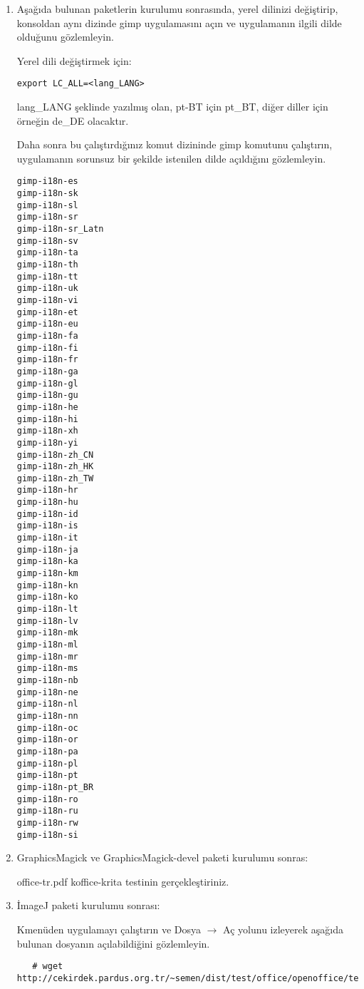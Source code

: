 \documentclass[a4paper,10pt]{article}
\begin{document}
\begin{enumerate}
Aşağıda bulunan komutların sorunsuz olarak çalıştığını gözlemleyin.
\begin{verbatim}
# wget http://cekirdek.pardus.org.tr/~semen/dist/test/multimedia/graphics/test_graphviz.mm
# mm2gv  test_graphviz.mm -o test.gv
# dotty test.gv
# gv2gxl test.gv -o test.gxl
# gxl2dot test.gxl test.dot
# acyclic test.dot test_asyclic.dot
# lneato test.dot
# vimdot test.dot
\end{verbatim}

 \item Aşağıda bulunan paketlerin kurulumu sonrasında, yerel dilinizi değiştirip, konsoldan aynı dizinde gimp uygulamasını açın ve uygulamanın ilgili dilde olduğunu gözlemleyin.

Yerel dili değiştirmek için:
\begin{verbatim}
export LC_ALL=<lang_LANG>
\end{verbatim}

lang\_LANG şeklinde yazılmış olan, pt-BT için pt\_BT, diğer diller için örneğin de\_DE olacaktır.

Daha sonra bu çalıştırdığınız komut dizininde gimp komutunu çalıştırın, uygulamanın sorunsuz bir şekilde istenilen dilde açıldığını gözlemleyin.
\begin{verbatim}
gimp-i18n-es
gimp-i18n-sk
gimp-i18n-sl
gimp-i18n-sr
gimp-i18n-sr_Latn
gimp-i18n-sv
gimp-i18n-ta
gimp-i18n-th
gimp-i18n-tt
gimp-i18n-uk
gimp-i18n-vi
gimp-i18n-et
gimp-i18n-eu
gimp-i18n-fa
gimp-i18n-fi
gimp-i18n-fr
gimp-i18n-ga
gimp-i18n-gl
gimp-i18n-gu
gimp-i18n-he
gimp-i18n-hi
gimp-i18n-xh
gimp-i18n-yi
gimp-i18n-zh_CN
gimp-i18n-zh_HK
gimp-i18n-zh_TW
gimp-i18n-hr
gimp-i18n-hu
gimp-i18n-id
gimp-i18n-is
gimp-i18n-it
gimp-i18n-ja
gimp-i18n-ka
gimp-i18n-km
gimp-i18n-kn
gimp-i18n-ko
gimp-i18n-lt
gimp-i18n-lv
gimp-i18n-mk
gimp-i18n-ml
gimp-i18n-mr
gimp-i18n-ms
gimp-i18n-nb
gimp-i18n-ne
gimp-i18n-nl
gimp-i18n-nn
gimp-i18n-oc
gimp-i18n-or
gimp-i18n-pa
gimp-i18n-pl
gimp-i18n-pt
gimp-i18n-pt_BR
gimp-i18n-ro
gimp-i18n-ru
gimp-i18n-rw
gimp-i18n-si 
\end{verbatim}


 \item GraphicsMagick ve GraphicsMagick-devel paketi kurulumu sonras:

office-tr.pdf koffice-krita testinin gerçekleştiriniz.

 \item İmageJ paketi kurulumu sonrası:

 Kmenüden uygulamayı çalıştırın ve Dosya $\rightarrow$ Aç yolunu izleyerek aşağıda bulunan dosyanın açılabildiğini gözlemleyin.
  \begin{verbatim}
   # wget http://cekirdek.pardus.org.tr/~semen/dist/test/office/openoffice/test_oodraw.jpg
  \end{verbatim}


\end{enumerate}
\end{document}
